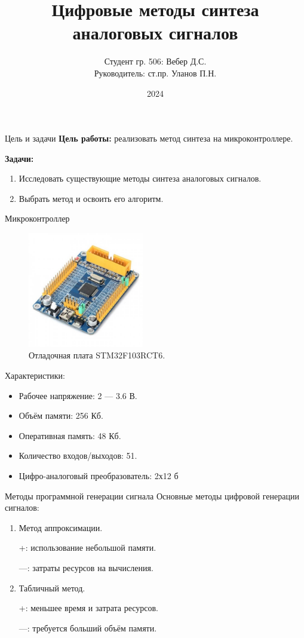 \documentclass[10pt]{beamer}
\begin{document}
\title{Цифровые методы синтеза аналоговых сигналов}
\author{Студент гр. 506: Вебер Д.С.\\Руководитель:  ст.пр. Уланов П.Н.}
\date{2024}


\frame{\titlepage}

\begin{frame}{Цель и задачи}
  \textbf{Цель работы:} реализовать метод синтеза на микроконтроллере.

  \textbf{Задачи:} 
  \begin{enumerate}
		\item Исследовать существующие методы синтеза аналоговых сигналов.
		\item Выбрать метод и освоить его алгоритм.
  \end{enumerate}
\end{frame}

\begin{frame}{Микроконтроллер}
  \begin{figure}
  \includegraphics[width=0.45\textwidth]{stmka}
  \caption{Отладочная плата STM32F103RCT6.}
  \end{figure}
  Характеристики:
  \begin{itemize}
 	 \item Рабочее напряжение: 2 --- 3.6 В.
 	 \item Объём памяти: 256 Кб.
  	 \item Оперативная память: 48 Кб.
 	 \item Количество входов/выходов: 51.
 	 \item Цифро-аналоговый преобразователь: 2х12 б
  \end{itemize}
\end{frame}

\begin{frame}{Методы программной генерации сигнала}
Основные методы цифровой генерации сигналов:
  \begin{enumerate}
		\item Метод аппроксимации. 
		
		+: использование небольшой памяти. 
		
		---: затраты ресурсов на вычисления.
		\item Табличный метод.
		
		+: меньшее время и затрата ресурсов. 
		
		---: требуется больший объём памяти.
  \end{enumerate}


\end{frame}
\end{document}
